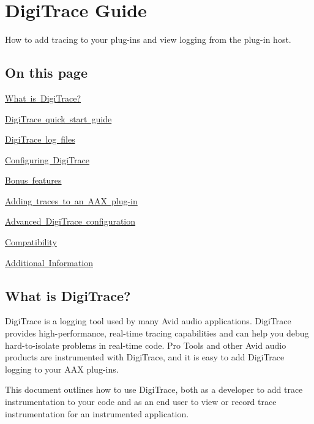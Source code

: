 \hypertarget{a00834}{}\section{Digi\+Trace Guide}
\label{a00834}
How to add tracing to your plug-\/ins and view logging from the plug-\/in host. 

\hypertarget{a00834_digitrace__contents}{}\subsection{On this page}\label{a00834_digitrace__contents}
\begin{DoxyItemize}
\item \mbox{\hyperlink{a00834_digitrace__intro}{What is Digi\+Trace?}} \item \mbox{\hyperlink{a00834_digitrace__quickstart}{Digi\+Trace quick start guide}} \item \mbox{\hyperlink{a00834_digitrace__logfiles}{Digi\+Trace log files}} \item \mbox{\hyperlink{a00834_digitrace__configuring}{Configuring Digi\+Trace}} \item \mbox{\hyperlink{a00834_digitrace__bonus_features}{Bonus features}} \item \mbox{\hyperlink{a00834_digitrace__tracingfromplugins}{Adding traces to an A\+AX plug-\/in}} \item \mbox{\hyperlink{a00834_digitrace__advancedconfiguration}{Advanced Digi\+Trace configuration}} \item \mbox{\hyperlink{a00834_digitrace__compatibility}{Compatibility}} \item \mbox{\hyperlink{a00834_digitrace__additionalinformation}{Additional Information}}\end{DoxyItemize}
 \hypertarget{a00834_digitrace__intro}{}\subsection{What is Digi\+Trace?}\label{a00834_digitrace__intro}
 Digi\+Trace is a logging tool used by many Avid audio applications. Digi\+Trace provides high-\/performance, real-\/time tracing capabilities and can help you debug hard-\/to-\/isolate problems in real-\/time code. Pro Tools and other Avid audio products are instrumented with Digi\+Trace, and it is easy to add Digi\+Trace logging to your A\+AX plug-\/ins.

 This document outlines how to use Digi\+Trace, both as a developer to add trace instrumentation to your code and as an end user to view or record trace instrumentation for an instrumented application.

